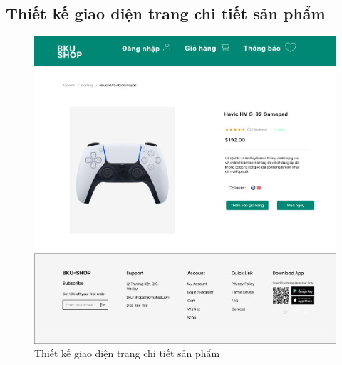 \subsection {Thiết kế giao diện trang chi tiết sản phẩm}
\begin{figure}[H]
    \begin{center}
    \includegraphics[scale=0.3]{images/hieu/chap-4/product-detail.jpg}
    \vspace*{5mm}
    \caption{Thiết kế giao diện trang chi tiết sản phẩm}
    \end{center}
\end{figure}
